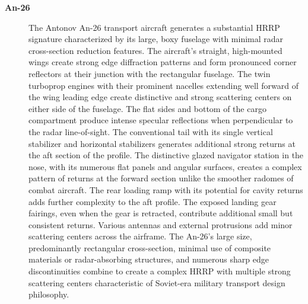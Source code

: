 {\begin{description}
    \item[\textbf{An-26}]
    The Antonov An-26 transport aircraft generates a substantial HRRP signature characterized by its large, boxy fuselage with minimal radar cross-section reduction features. The aircraft's straight, high-mounted wings create strong edge diffraction patterns and form pronounced corner reflectors at their junction with the rectangular fuselage. The twin turboprop engines with their prominent nacelles extending well forward of the wing leading edge create distinctive and strong scattering centers on either side of the fuselage. The flat sides and bottom of the cargo compartment produce intense specular reflections when perpendicular to the radar line-of-sight. The conventional tail with its single vertical stabilizer and horizontal stabilizers generates additional strong returns at the aft section of the profile. The distinctive glazed navigator station in the nose, with its numerous flat panels and angular surfaces, creates a complex pattern of returns at the forward section unlike the smoother radomes of combat aircraft. The rear loading ramp with its potential for cavity returns adds further complexity to the aft profile. The exposed landing gear fairings, even when the gear is retracted, contribute additional small but consistent returns. Various antennas and external protrusions add minor scattering centers across the airframe. The An-26's large size, predominantly rectangular cross-section, minimal use of composite materials or radar-absorbing structures, and numerous sharp edge discontinuities combine to create a complex HRRP with multiple strong scattering centers characteristic of Soviet-era military transport design philosophy.


\end{description}}
